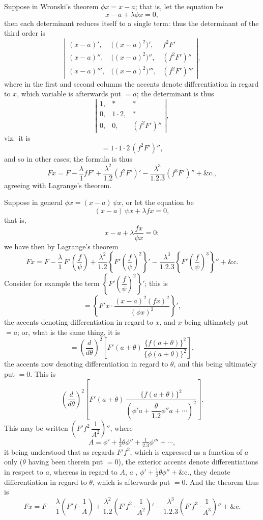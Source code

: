 \documentclass[11pt]{article}
\begin{document}
Suppose in Wronski's theorem $\phi x = x - a$; that is, let the equation be
\[
x - a + \lambda \phi x = 0,
\]
then each determinant reduces itself to a single term: thus the determinant of the third order is
\[
\left|\begin{array}{ccc}(x-a)',&\bigl((x-a)^{2}\bigr)',&f^{2}F'\\ (x-a)'',&\bigl((x-a)^{2}\bigr)'',&(f^{2}F')''\\ (x-a)''',&\bigl((x-a)^{2}\bigr)''',&(f^{2}F')'''\end{array}\right|,
\]
where in the first and second columns the accents denote differentiation in regard to $x$, which variable is afterwards put $=a$; the determinant is thus
\[
\left|\begin{array}{ccc}1,&*&*\\ 0,&1\cdot 2,&*\\ 0,&0,&(f^{2}F')''\end{array}\right|,
\]
viz.\ it is
\[
= 1\cdot 1\cdot 2\,(f^{2}F')'',
\]
and so in other cases; the formula is thus
\[
Fx = F - \frac{\lambda}{1}fF' + \frac{\lambda^{2}}{1.2}(f^{2}F')' - \frac{\lambda^{3}}{1.2.3}(f^{3}F')'' + \&\mathrm{c.},
\]
agreeing with Lagrange's theorem.

Suppose in general $\phi x = (x-a)\,\psi x$, or let the equation be
\[
(x-a)\,\psi x + \lambda fx = 0,
\]
that is,
\[
x - a + \lambda \frac{fx}{\psi x} = 0:
\]
we have then by Lagrange's theorem
\[
Fx = F - \frac{\lambda}{1}\,F'\!\left(\frac{f}{\psi}\right) + \frac{\lambda^{2}}{1.2}\left\{F'\!\left(\frac{f}{\psi}\right)^{2}\right\}' - \frac{\lambda^{3}}{1.2.3}\left\{F'\!\left(\frac{f}{\psi}\right)^{3}\right\}'' + \&\mathrm{c.}
\]
Consider for example the term $\left\{F'\!\left(\dfrac{f}{\psi}\right)^{2}\right\}'$; this is
\[
= \left\{F'x \cdot \frac{(x-a)^{2}(fx)^{2}}{(\phi x)^{2}}\right\}',
\]
the accents denoting differentiation in regard to $x$, and $x$ being ultimately put $=a$; or, what is the same thing, it is
\[
= \left(\frac{d}{d\theta}\right)^{2}\!\left[F'(a+\theta)\,\frac{\{f(a+\theta)\}^{2}}{\{\phi(a+\theta)\}^{2}}\right],
\]
the accents now denoting differentiation in regard to $\theta$, and this being ultimately put $=0$. This is
\[
\left(\frac{d}{d\theta}\right)^{2}\!\left[F'(a+\theta)\,\frac{\{f(a+\theta)\}^{2}}{\left(\phi'a + \dfrac{\theta}{1.2}\phi''a + \cdots\right)^{2}}\right].
\]
This may be written $\left(F'f^{2}\,\dfrac{1}{A^{2}}\right)''$, where
\[
A = \phi' + \tfrac{1}{2}\theta\phi'' + \tfrac{1}{2.3}\phi''' + \cdots,
\]
it being understood that as regards $F'f^{2}$, which is expressed as a function of $a$ only ($\theta$ having been therein put $=0$), the exterior accents denote differentiations in respect to $a$, whereas in regard to $A$, $a$ , $\phi' + \tfrac{1}{2}\theta\phi'' + \&\mathrm{c.}$, they denote differentiation in regard to $\theta$, which is afterwards put $=0$. And the theorem thus is
\[
Fx = F - \frac{\lambda}{1}\left(F'f \cdot \frac{1}{A}\right) + \frac{\lambda^{2}}{1.2}\left(F'f^{2} \cdot \frac{1}{A^{2}}\right)' - \frac{\lambda^{3}}{1.2.3}\left(F'f^{3} \cdot \frac{1}{A^{3}}\right)'' + \&\mathrm{c.}
\]
\end{document}
